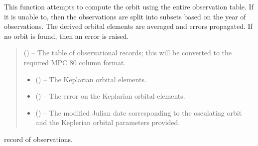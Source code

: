 \documentclass[letterpaper,11pt,english]{sphinxmanual}
\begin{document}
\begin{savenotes}
\begin{fulllineitems}
\begin{savenotes}
\begin{fulllineitems}
\sphinxAtStartPar
This function attempts to compute the orbit using the entire
observation table. If it is unable to, then the observations are split
into subsets based on the year of observations. The derived orbital
elements are averaged and errors propagated. If no orbit is found,
then an error is raised.
\begin{quote}\begin{description}
\sphinxAtStartPar
{} () – The table of observational records; this will be converted to the
required MPC 80 column format.

\sphinxAtStartPar
\begin{itemize}
\item {} 
\sphinxAtStartPar
{} () – The Keplarian orbital elements.

\item {} 
\sphinxAtStartPar
{} () – The error on the Keplarian orbital elements.

\item {} 
\sphinxAtStartPar
{} () – The modified Julian date corresponding to the osculating orbit and
the Keplerian orbital parameters provided.

\end{itemize}


\end{description}\end{quote}

\end{fulllineitems}\end{savenotes}


\begin{savenotes}\begin{fulllineitems}
\label{\detokenize{code/opihiexarata.orbit.orbfit:opihiexarata.orbit.orbfit.OrbfitOrbitDeterminerEngine.solve_orbit_via_record}}
\pysigstartsignatures
{}
\pysigstopsignatures\begin{description}
\sphinxAtStartPar
record of observations.


\end{description}
\end{fulllineitems}
\end{savenotes}
\end{fulllineitems}
\end{savenotes}
\end{document}
